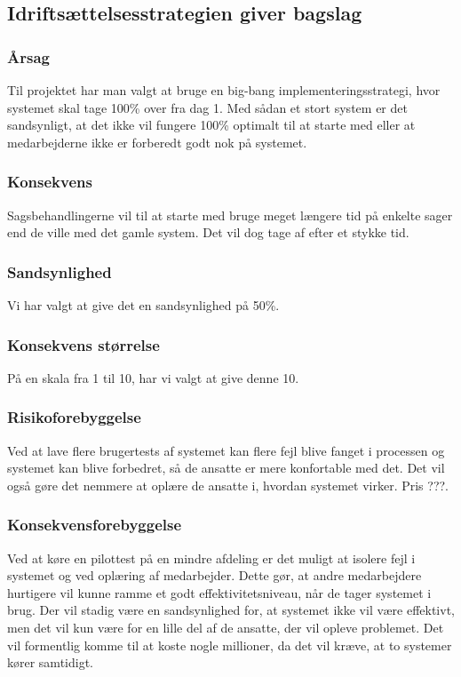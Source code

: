 \documentclass[10pt,a4paper,danish]{article}
\begin{document}






\subsection{Idriftsættelsesstrategien giver bagslag}
\subsubsection{Årsag}
Til projektet har man valgt at bruge en big-bang implementeringsstrategi, hvor systemet skal tage 100\% over fra dag 1.
Med sådan et stort system er det sandsynligt, at det ikke vil fungere 100\% optimalt til at starte med eller at medarbejderne ikke er forberedt godt nok på systemet.
\subsubsection{Konsekvens}
Sagsbehandlingerne vil til at starte med bruge meget længere tid på enkelte sager end de ville med det gamle system. Det vil dog tage af efter et stykke tid.
\subsubsection{Sandsynlighed}
Vi har valgt at give det en sandsynlighed på 50\%.
\subsubsection{Konsekvens størrelse}
På en skala fra 1 til 10, har vi valgt at give denne 10.
\subsubsection{Risikoforebyggelse}
Ved at lave flere brugertests af systemet kan flere fejl blive fanget i processen og systemet kan blive forbedret, så de ansatte er mere konfortable med det. Det vil også gøre det nemmere at oplære de ansatte i, hvordan systemet virker. Pris ???.
\subsubsection{Konsekvensforebyggelse}
Ved at køre en pilottest på en mindre afdeling er det muligt at isolere fejl i systemet og ved oplæring af medarbejder. 
Dette gør, at andre medarbejdere hurtigere vil kunne ramme et godt effektivitetsniveau, når de tager systemet i brug.
Der vil stadig være en sandsynlighed for, at systemet ikke vil være effektivt, men det vil kun være for en lille del af de ansatte, der vil opleve problemet. Det vil formentlig komme til at koste nogle millioner, da det vil kræve, at to systemer kører samtidigt.
\end{document}
